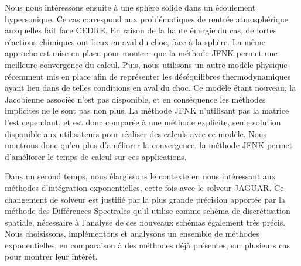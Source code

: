 Nous nous intéressons ensuite à une sphère solide dans un écoulement hypersonique.
Ce cas correspond aux problématiques de rentrée atmosphérique auxquelles fait face CEDRE.
En raison de la haute énergie du cas, de fortes réactions chimiques ont lieux en aval du choc, face à la sphère.
La même approche est mise en place pour montrer que la méthode JFNK permet une meilleure convergence du calcul.
Puis, nous utilisons un autre modèle physique récemment mis en place afin de représenter les déséquilibres thermodynamiques ayant lieu dans de telles conditions en aval du choc.
Ce modèle étant nouveau, la Jacobienne associée n'est pas disponible, et en conséquence les méthodes implicites ne le sont pas non plus.
La méthode JFNK n'utilisant pas la matrice l'est cependant, et est donc comparée à une méthode explicite, seule solution disponible aux utilisateurs pour réaliser des calculs avec ce modèle.
Nous montrons donc qu'en plus d'améliorer la convergence, la méthode JFNK permet d'améliorer le temps de calcul sur ces applications.

Dans un second temps, nous élargissons le contexte en nous intéressant aux méthodes d'intégration exponentielles, cette fois avec le solveur JAGUAR.
Ce changement de solveur est justifié par la plus grande précision apportée par la méthode des Différences Spectrales qu'il utilise comme schéma de discrétisation spatiale, nécessaire à l'analyse de ces nouveaux schémas également très précis.
Nous choisissons, implémentons et analysons un ensemble de méthodes exponentielles, en comparaison à des méthodes déjà présentes, sur plusieurs cas pour montrer leur intérêt.
